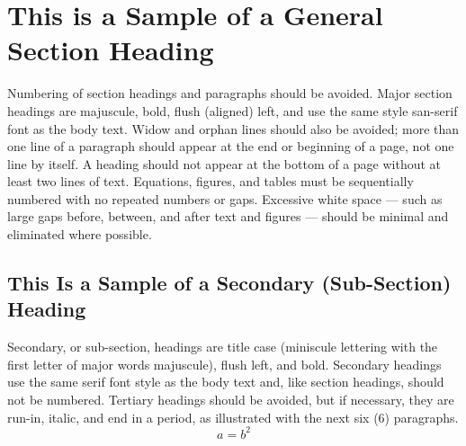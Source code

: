 \documentclass[letterpaper, preprint, paper,11pt]{AAS}	%
\begin{document}



\section{This is a Sample of a General Section Heading}
Numbering of section headings and paragraphs should be avoided. Major section headings are majuscule, bold, flush (aligned) left, and use the same style san-serif font as the body text. Widow and orphan lines should also be avoided; more than one line of a paragraph should appear at the end or beginning of a page, not one line by itself. A heading should not appear at the bottom of a page without at least two lines of text. Equations, figures, and tables must be sequentially numbered with no repeated numbers or gaps. Excessive white space --- such as large gaps before, between, and after text and figures --- should be minimal and eliminated where possible.





\subsection{This Is a Sample of a Secondary (Sub-Section) Heading}
Secondary, or sub-section, headings are title case (miniscule lettering with the first letter of major words majuscule), flush left, and bold. Secondary headings use the same serif font style as the body text and, like section headings, should not be numbered. Tertiary headings should be avoided, but if necessary, they are run-in, italic, and end in a period, as illustrated with the next six (6) paragraphs.
\begin{equation}
	\label{eq:ab}
	a = b^{2}
\end{equation}
\end{document}
